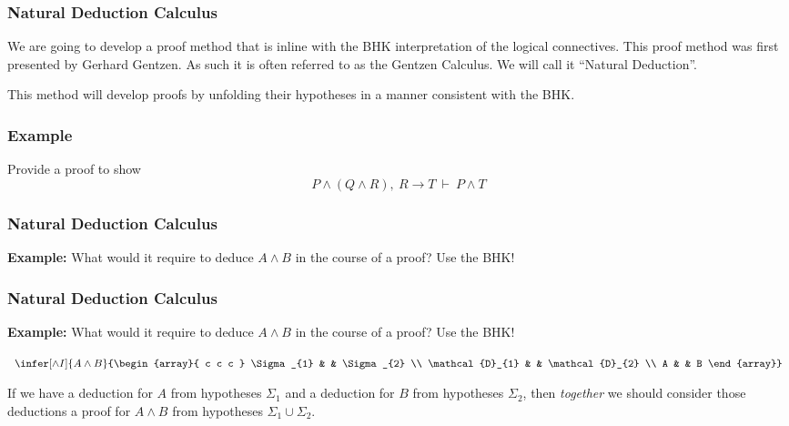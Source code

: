 \documentclass{beamer}
\begin{document}
\begin{frame}
  \frametitle{Natural Deduction Calculus}

  We are going to develop a proof method that is inline with the BHK interpretation of the logical connectives. This proof method was first presented by Gerhard Gentzen. As such it is often referred to as the Gentzen Calculus. We will call it ``Natural Deduction''.

  \vspace{5mm}

  This method will develop proofs by unfolding their hypotheses in a manner consistent with the BHK.
\end{frame}

\begin{frame}
	\frametitle{Example}
	Provide a proof to show $$P \land (Q \land R), \ R \to T  \ \vdash \ P \land T$$


	\vspace{6cm}
	
\end{frame}

\begin{frame}
	\frametitle{Natural Deduction Calculus}

	{\bf Example:} What would it require to deduce $A \land B$ in the course of a proof? Use the BHK!

	\vspace{70mm}

\end{frame}

\begin{frame}
	\frametitle{Natural Deduction Calculus}

	{\bf Example:} What would it require to deduce $A \land B$ in the course of a proof? Use the BHK!

	\begin{center}
		$\begin{array}{ c  c  c }			
			\infer[\land I]{A \land B}
				{\begin{array}{ c  c  c }			
					\Sigma_{1} & & \Sigma_{2} \\
					\mathcal{D}_{1} & & \mathcal{D}_{2} \\
					A & & B 
				\end{array}}
		\end{array}$
	\end{center}

	If we have a deduction for $A$ from hypotheses $\Sigma_{1}$ and a deduction for $B$ from hypotheses $\Sigma_{2}$, then \emph{together} we should consider those deductions a proof for $A \land B$ from hypotheses $\Sigma_{1} \cup \Sigma_{2}$.
	\vspace{30mm}

\end{frame}
\end{document}
